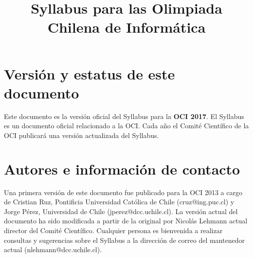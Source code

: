 \documentclass{article}
\begin{document}
\title{Syllabus para las Olimpiada Chilena de Informática}
\date{}
\maketitle

\section{Versión y estatus de este documento}
Este documento es la versión oficial del Syllabus para la \textbf{OCI 2017}.
El Syllabus es un documento oficial relacionado a la OCI.
Cada año el Comité Científico de la OCI publicará una versión actualizada del Syllabus.

\section{Autores e información de contacto}
Una primera versión de este documento fue publicado para la OCI 2013 a cargo de
Cristian Ruz, Pontificia Universidad Católica de Chile (cruz@ing.puc.cl) y
Jorge Pérez, Universidad de Chile (jperez@dcc.uchile.cl).
La versión actual del documento ha sido modificada a partir de la original por Nicolás
Lehmann actual director del Comité Científico.
Cualquier persona es bienvenida a realizar consultas y sugerencias sobre el
Syllabus a la dirección de correo del mantenedor actual (nlehmann@dcc.uchile.cl).
\end{document}
